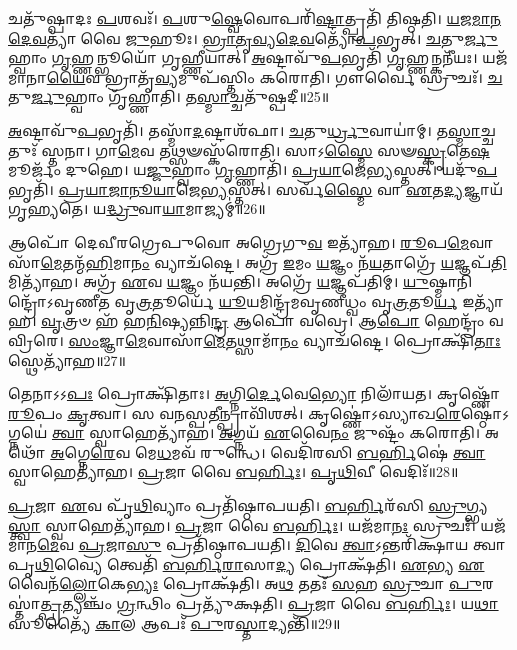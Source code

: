 𑌚𑌤𑍁᳴𑌷𑍍𑌪𑌾𑌦𑌃 \ul{𑌪}\-𑌶𑌵𑌃᳴।
\-\ul{𑌪}\-𑌶𑍁\-\ul{𑌷𑍍𑌵𑍇}\-𑌵𑍋𑌪𑌰𑌿᳴\-\ul{𑌷𑍍𑌟𑌾}\-𑌤𑍍𑌪𑍍𑌰𑌤𑌿᳴ 𑌤𑌿𑌷𑍍𑌠𑌤𑌿।
\-\ul{𑌯}\-\-\ul{𑌜}\-\-\ul{𑌮𑌾}\-\-\ul{𑌨}\-\-\ul{𑌦𑍇}\-\-\ul{𑌵}\-𑌤𑍍𑌯𑌾᳴ 𑌵𑍈 \ul{𑌜𑍁}\-𑌹𑍂𑌃।
\-\ul{𑌭𑍍𑌰𑌾}\-\-\ul{𑌤𑍃}\-\-\ul{𑌵𑍍𑌯}\-\-\ul{𑌦𑍇}\-\-\ul{𑌵}\-𑌤𑍍𑌯𑍋᳴\-\ul{𑌪}\-𑌭𑍃𑌤𑍍।
\-\ul{𑌚}\-𑌤𑍁\-\ul{𑌰𑍍𑌜𑍁}\-𑌹𑍍𑌵𑌾𑌂 \ul{𑌗𑍃}\-𑌹𑍍𑌣𑌨𑍍𑌭𑍂𑌯𑍋᳴ 𑌗𑍃𑌹𑍍𑌣𑍀𑌯𑌾𑌤𑍍।
\-\ul{𑌅}\-𑌷𑍍𑌟𑌾𑌵𑍁᳴\-\ul{𑌪}\-𑌭𑍃𑌤𑌿᳴ \ul{𑌗𑍃}\-𑌹𑍍𑌣𑌨𑍍𑌕𑌨𑍀᳴𑌯𑌃।
𑌯𑌜᳴𑌮𑌾𑌨𑌾\-\ul{𑌯𑍈}\-𑌵 𑌭𑍍𑌰𑌾𑌤𑍃᳴\-\ul{𑌵𑍍𑌯}\-𑌮𑍁𑌪᳴𑌸𑍍𑌤𑌿𑌂 𑌕𑌰𑍋𑌤𑌿।
𑌗𑍗𑌰𑍍𑌵𑍈 𑌸𑍍𑌰𑍁𑌚𑌃᳴।
\-\ul{𑌚}\-𑌤𑍁\-\ul{𑌰𑍍𑌜𑍁}\-𑌹𑍍𑌵𑌾𑌂 𑌗𑍃᳴𑌹𑍍𑌣𑌾𑌤𑌿।
𑌤\-\ul{𑌸𑍍𑌮𑌾}\-𑌚𑍍𑌚𑌤𑍁᳴𑌷𑍍𑌪𑌦𑍀॥25॥

\-\ul{𑌅}\-𑌷𑍍𑌟𑌾𑌵𑍁᳴\-\ul{𑌪}\-𑌭𑍃𑌤𑌿᳴।
𑌤𑌸𑍍𑌮𑌾᳴\-\ul{𑌦}\-𑌷𑍍𑌟𑌾𑌶᳴𑌫𑌾।
\-\ul{𑌚}\-𑌤𑍁\-\ul{𑌰𑍍𑌧𑍍𑌰𑍁}\-𑌵𑌾𑌯𑌾॑𑌮𑍍।
𑌤\-\ul{𑌸𑍍𑌮𑌾}\-𑌚𑍍𑌚𑌤𑍁𑌃᳴ 𑌸𑍍𑌤𑌨𑌾।
𑌗𑌾\-\ul{𑌮𑍇}\-𑌵 𑌤𑌥𑍍𑌸𑍟𑌸𑍍𑌕᳴𑌰𑍋𑌤𑌿।
𑌸𑌾𑌽\-\ul{𑌸𑍍𑌮𑍈} 𑌸𑍟\-\ul{𑌸𑍍𑌕𑍃}\-𑌤𑍇\-\ul{𑌷}\-𑌮𑍂𑌰𑍍𑌜𑌂᳴ 𑌦𑍁𑌹𑍇।
𑌯\-\ul{𑌜𑍍𑌜𑍁}\-𑌹𑍍𑌵𑌾𑌂 \ul{𑌗𑍃}\-𑌹𑍍𑌣𑌾𑌤𑌿᳴।
\-\ul{𑌪𑍍𑌰}\-\-\ul{𑌯𑌾}\-𑌜𑍇\-\ul{𑌭𑍍𑌯}\-𑌸𑍍𑌤𑌤𑍍।
𑌯𑌦𑍁᳴\-\ul{𑌪}\-𑌭𑍃𑌤𑌿᳴।
\-\ul{𑌪𑍍𑌰}\-\-\ul{𑌯𑌾}\-\-\ul{𑌜𑌾}\-\-\ul{𑌨𑍂}\-\-\ul{𑌯𑌾}\-𑌜𑍇\-\ul{𑌭𑍍𑌯}\-𑌸𑍍𑌤𑌤𑍍।
𑌸𑌰𑍍𑌵᳴\-\ul{𑌸𑍍𑌮𑍈} 𑌵𑌾 \ul{𑌏}\-𑌤\-\ul{𑌦𑍍𑌯}\-𑌜𑍍𑌞𑌾𑌯᳴ 𑌗𑍃𑌹𑍍𑌯𑌤𑍇।
𑌯\-\ul{𑌦𑍍𑌧𑍍𑌰𑍁}\-𑌵𑌾\-\ul{𑌯𑌾}\-𑌮𑌾𑌜𑍍𑌯𑌮𑍍॑॥26॥\anuvakamend[\-\ul{𑌅}\-\-\ul{𑌭𑌿}\-\-\ul{𑌘𑌾}\-𑌰𑌯᳴𑌤𑌿 𑌗𑍃𑌹𑍍𑌣𑌾𑌤𑌿 \ul{𑌧𑍍𑌰𑍁}\-𑌵𑌾\-\ul{𑌯𑌾𑌂} 𑌚𑌤𑍁᳴𑌷𑍍𑌪𑌦𑍀 𑌪𑍍𑌰𑌯𑌾𑌜𑌾𑌨𑍂\-\ul{𑌯𑌾}\-𑌜𑍇\-\ul{𑌭𑍍𑌯}\-𑌸𑍍𑌤𑌦𑍍𑌦𑍍𑌵𑍇 𑌚᳴]

𑌆𑌪𑍋᳴ 𑌦𑍇𑌵𑍀𑌰𑌗𑍍𑌰𑍇𑌪𑍁𑌵𑍋 𑌅𑌗𑍍𑌰𑍇𑌗𑍁\-\ul{𑌵} 𑌇𑌤𑍍𑌯𑌾᳴𑌹।
\-\ul{𑌰𑍂}\-𑌪\-\ul{𑌮𑍇}\-𑌵𑌾𑌸𑌾᳴\-\ul{𑌮𑍇}\-𑌤𑌨𑍍𑌮᳴\-\ul{𑌹𑌿}\-\-𑌮𑌾\-\ul{𑌨𑌂} 𑌵𑍍𑌯𑌾𑌚᳴𑌷𑍍𑌟𑍇।
𑌅𑌗𑍍𑌰᳴ \ul{𑌇}\-𑌮𑌂 \ul{𑌯}\-𑌜𑍍𑌞𑌂 𑌨᳴\-\ul{𑌯}\-𑌤𑌾𑌗𑍍𑌰𑍇᳴ \ul{𑌯}\-𑌜𑍍𑌞𑌪᳴\-\ul{𑌤𑌿}\-𑌮𑌿𑌤𑍍𑌯𑌾᳴𑌹।
𑌅𑌗𑍍𑌰᳴ \ul{𑌏}\-𑌵 \ul{𑌯}\-𑌜𑍍𑌞𑌂 𑌨᳴𑌯𑌨𑍍𑌤𑌿।
𑌅𑌗𑍍𑌰𑍇᳴ \ul{𑌯}\-𑌜𑍍𑌞𑌪᳴𑌤𑌿𑌮𑍍।
\-\ul{𑌯𑍁}\-𑌷𑍍𑌮𑌾𑌨𑌿𑌨𑍍𑌦𑍍𑌰𑍋᳴\-𑌽𑌵𑍃𑌣𑍀𑌤 𑌵𑍃\-\ul{𑌤𑍍𑌰}\-𑌤𑍂𑌰𑍍𑌯𑍇᳴ \ul{𑌯𑍂}\-𑌯𑌮𑌿𑌨𑍍𑌦𑍍𑌰᳴𑌮𑌵𑍃𑌣𑍀𑌧𑍍𑌵𑌂 𑌵𑍃\-\ul{𑌤𑍍𑌰}\-𑌤𑍂\-\ul{𑌰𑍍𑌯} 𑌇𑌤𑍍𑌯𑌾᳴𑌹।
\-\ul{𑌵𑍃}\-𑌤𑍍𑌰𑍞 𑌹᳴ 𑌹\-\ul{𑌨𑌿}\-𑌷𑍍𑌯𑌨𑍍𑌨𑌿\-\ul{𑌨𑍍𑌦𑍍𑌰} 𑌆𑌪𑍋᳴ 𑌵𑌵𑍍𑌰𑍇।
𑌆\-\ul{𑌪𑍋} 𑌹𑍇𑌨𑍍𑌦𑍍𑌰𑌂᳴ 𑌵𑌵𑍍𑌰𑌿𑌰𑍇।
\-\ul{𑌸𑌂}\-𑌜𑍍𑌞𑌾\-\ul{𑌮𑍇}\-𑌵𑌾𑌸𑌾᳴\-\ul{𑌮𑍇}\-𑌤𑌥𑍍𑌸𑌾𑌮𑌾᳴\-\ul{𑌨𑌂} 𑌵𑍍𑌯𑌾𑌚᳴𑌷𑍍𑌟𑍇।
𑌪𑍍𑌰𑍋𑌕𑍍𑌷𑌿᳴\-\ul{𑌤𑌾𑌃} 𑌸𑍍𑌥𑍇𑌤𑍍𑌯𑌾᳴𑌹॥27॥

𑌤𑍇𑌨𑌾𑌽𑌽\-\ul{𑌪𑌃} 𑌪𑍍𑌰𑍋𑌕𑍍𑌷𑌿᳴𑌤𑌾𑌃।
\-\ul{𑌅}\-𑌗𑍍𑌨𑌿\-\ul{𑌰𑍍𑌦𑍇}\-𑌵𑍇\-\ul{𑌭𑍍𑌯𑍋} 𑌨𑌿𑌲𑌾᳴𑌯𑌤।
𑌕𑍃𑌷𑍍𑌣𑍋᳴ \ul{𑌰𑍂}\-𑌪𑌂 \ul{𑌕𑍃}\-𑌤𑍍𑌵𑌾।
𑌸 𑌵\-\ul{𑌨}\-𑌸𑍍𑌪\-\ul{𑌤𑍀}\-𑌨𑍍𑌪𑍍𑌰𑌾𑌵𑌿᳴𑌶𑌤𑍍।
𑌕𑍃𑌷𑍍𑌣𑍋॑\-𑌽𑌸𑍍𑌯𑌾𑌖\-\ul{𑌰𑍇}\-𑌷𑍍𑌠𑍋॑\-𑌽𑌗𑍍𑌨𑌯𑍇॑ \ul{𑌤𑍍𑌵𑌾} 𑌸𑍍𑌵𑌾𑌹𑍇𑌤𑍍𑌯𑌾᳴𑌹।
\-\ul{𑌅}\-𑌗𑍍𑌨𑌯᳴ \ul{𑌏}\-𑌵𑍈\-\ul{𑌨𑌂} 𑌜𑍁𑌷𑍍𑌟𑌂᳴ 𑌕𑌰𑍋𑌤𑌿।
𑌅𑌥𑍋᳴ \ul{𑌅}\-𑌗𑍍𑌨𑍇\-\ul{𑌰𑍇}\-𑌵 𑌮𑍇\-\ul{𑌧}\-𑌮𑌵᳴ 𑌰𑍁𑌨𑍍𑌧𑍇।
𑌵𑍇𑌦𑌿᳴𑌰𑌸𑌿 \ul{𑌬}\-\-\ul{𑌰𑍍}\-𑌹𑌿𑌷𑍇॑ \ul{𑌤𑍍𑌵𑌾} 𑌸𑍍𑌵𑌾𑌹𑍇𑌤𑍍𑌯𑌾᳴𑌹।
\-\ul{𑌪𑍍𑌰}\-𑌜𑌾 𑌵𑍈 \ul{𑌬}\-\-\ul{𑌰𑍍}\-𑌹𑌿𑌃।
\-\ul{𑌪𑍃}\-\-\ul{𑌥𑌿}\-𑌵𑍀 𑌵𑍇𑌦𑌿𑌃᳴॥28॥

\-\ul{𑌪𑍍𑌰}\-𑌜𑌾 \ul{𑌏}\-𑌵 𑌪𑍃᳴\-\ul{𑌥𑌿}\-𑌵𑍍𑌯𑌾𑌂 𑌪𑍍𑌰𑌤𑌿᳴\-𑌷𑍍𑌠𑌾𑌪𑌯𑌤𑌿।
\-\ul{𑌬}\-\-\ul{𑌰𑍍}\-𑌹𑌿𑌰᳴𑌸𑌿 \ul{𑌸𑍍𑌰𑍁}\-𑌗𑍍𑌭𑍍𑌯\-\ul{𑌸𑍍𑌤𑍍𑌵𑌾} 𑌸𑍍𑌵𑌾𑌹𑍇𑌤𑍍𑌯𑌾᳴𑌹।
\-\ul{𑌪𑍍𑌰}\-𑌜𑌾 𑌵𑍈 \ul{𑌬}\-\-\ul{𑌰𑍍}\-𑌹𑌿𑌃।
𑌯𑌜᳴𑌮𑌾\-\ul{𑌨𑌃} 𑌸𑍍𑌰𑍁𑌚𑌃᳴।
𑌯𑌜᳴𑌮𑌾𑌨\-\ul{𑌮𑍇}\-𑌵 \ul{𑌪𑍍𑌰}\-𑌜𑌾\-\ul{𑌸𑍁} 𑌪𑍍𑌰𑌤𑌿᳴\-𑌷𑍍𑌠𑌾𑌪𑌯𑌤𑌿।
\-\ul{𑌦𑌿}\-𑌵𑍇 \ul{𑌤𑍍𑌵𑌾}\-\-𑌽𑌨𑍍𑌤𑌰𑌿᳴𑌕𑍍𑌷𑌾𑌯 𑌤𑍍𑌵𑌾 𑌪𑍃\-\ul{𑌥𑌿}\-𑌵𑍍𑌯𑍈 𑌤𑍍𑌵𑍇𑌤𑌿᳴ \ul{𑌬}\-\-\ul{𑌰𑍍}\-𑌹𑌿\-\ul{𑌰𑌾}\-𑌸𑌾\-\ul{𑌦𑍍𑌯} 𑌪𑍍𑌰𑍋𑌕𑍍𑌷᳴𑌤𑌿।
\-\ul{𑌏}\-𑌭𑍍𑌯 \ul{𑌏}\-𑌵𑍈𑌨᳴\-\ul{𑌲𑍍𑌲𑍋}\-𑌕𑍇\-\ul{𑌭𑍍𑌯𑌃} 𑌪𑍍𑌰𑍋𑌕𑍍𑌷᳴𑌤𑌿।
𑌅\-\ul{𑌥} 𑌤𑌤𑌃᳴ \ul{𑌸}\-𑌹 \ul{𑌸𑍍𑌰𑍁}\-𑌚𑌾 \ul{𑌪𑍁}\-𑌰𑌸𑍍𑌤𑌾॑\-\ul{𑌤𑍍𑌪𑍍𑌰}\-𑌤𑍍𑌯𑌞𑍍𑌚𑌂᳴ \ul{𑌗𑍍𑌰}\-𑌨𑍍𑌥𑌿𑌂 𑌪𑍍𑌰𑌤𑍍𑌯𑍁᳴𑌕𑍍𑌷𑌤𑌿।
\-\ul{𑌪𑍍𑌰}\-𑌜𑌾 𑌵𑍈 \ul{𑌬}\-\-\ul{𑌰𑍍}\-𑌹𑌿𑌃।
𑌯\-\ul{𑌥𑌾} 𑌸𑍂𑌤𑍍𑌯𑍈᳴ \ul{𑌕𑌾}\-𑌲 𑌆𑌪𑌃᳴ \ul{𑌪𑍁}\-𑌰\-\ul{𑌸𑍍𑌤𑌾}\-𑌦𑍍𑌯𑌨𑍍𑌤𑌿᳴॥29॥

